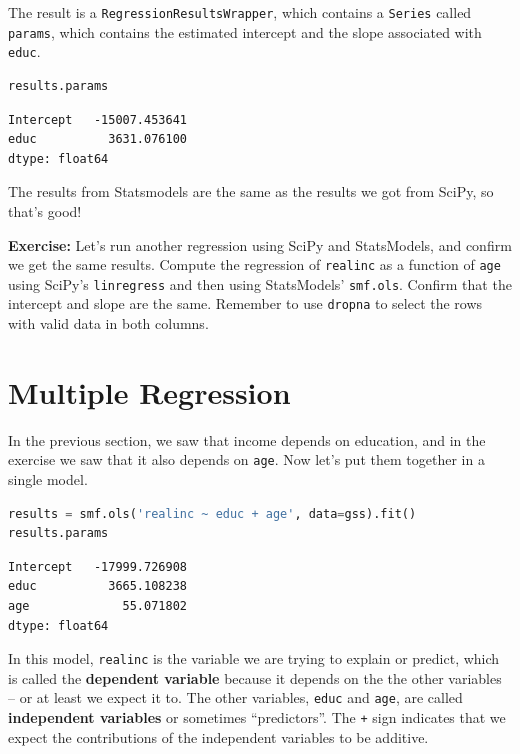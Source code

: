 The result is a \passthrough{\lstinline!RegressionResultsWrapper!},
which contains a \passthrough{\lstinline!Series!} called
\passthrough{\lstinline!params!}, which contains the estimated intercept
and the slope associated with \passthrough{\lstinline!educ!}.

\begin{lstlisting}[language=Python,style=source]
results.params
\end{lstlisting}

\begin{lstlisting}[style=output]
Intercept   -15007.453641
educ          3631.076100
dtype: float64
\end{lstlisting}

The results from Statsmodels are the same as the results we got from
SciPy, so that's good!

\textbf{Exercise:} Let's run another regression using SciPy and
StatsModels, and confirm we get the same results. Compute the regression
of \passthrough{\lstinline!realinc!} as a function of
\passthrough{\lstinline!age!} using SciPy's
\passthrough{\lstinline!linregress!} and then using StatsModels'
\passthrough{\lstinline!smf.ols!}. Confirm that the intercept and slope
are the same. Remember to use \passthrough{\lstinline!dropna!} to select
the rows with valid data in both columns.

\hypertarget{multiple-regression}{%
\section{Multiple Regression}\label{multiple-regression}}

In the previous section, we saw that income depends on education, and in
the exercise we saw that it also depends on
\passthrough{\lstinline!age!}. Now let's put them together in a single
model.

\begin{lstlisting}[language=Python,style=source]
results = smf.ols('realinc ~ educ + age', data=gss).fit()
results.params
\end{lstlisting}

\begin{lstlisting}[style=output]
Intercept   -17999.726908
educ          3665.108238
age             55.071802
dtype: float64
\end{lstlisting}

In this model, \passthrough{\lstinline!realinc!} is the variable we are
trying to explain or predict, which is called the \textbf{dependent
variable} because it depends on the the other variables -- or at least
we expect it to. The other variables, \passthrough{\lstinline!educ!} and
\passthrough{\lstinline!age!}, are called \textbf{independent variables}
or sometimes ``predictors''. The \passthrough{\lstinline!+!} sign
indicates that we expect the contributions of the independent variables
to be additive.

